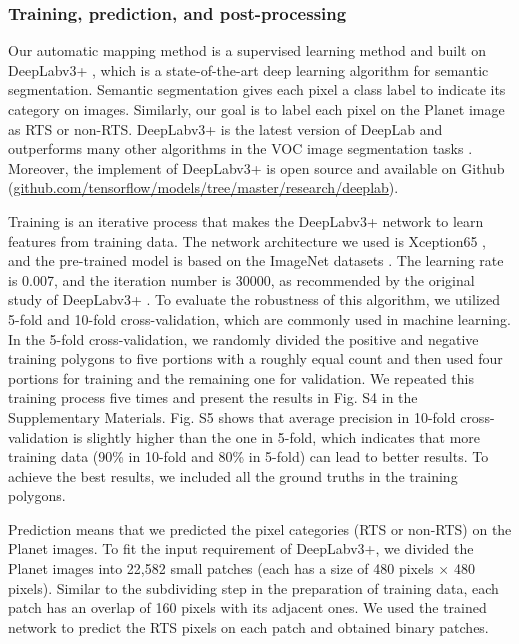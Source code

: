 \documentclass[preprint,12pt,authoryear]{elsarticle}
\begin{document}
\subsubsection{Training, prediction, and post-processing}
\label{subsubsec_deeplab}

Our automatic mapping method is a supervised learning method and built on DeepLabv3+ \citep{chen_encoder-decoder_2018}, which is a state-of-the-art deep learning algorithm for semantic segmentation. Semantic segmentation gives each pixel a class label to indicate its category on images. Similarly, our goal is to label each pixel on the Planet image as RTS or non-RTS. DeepLabv3+ is the latest version of DeepLab and outperforms many other algorithms in the VOC image segmentation tasks \citep{everingham_pascal_2015}. Moreover, the implement of DeepLabv3+ is open source and available on Github (\url{github.com/tensorflow/models/tree/master/research/deeplab}).

Training is an iterative process that makes the DeepLabv3+ network to learn features from training data. The network architecture we used is Xception65 \citep{chollet2017xception}, and the pre-trained model is based on the ImageNet datasets \citep{russakovsky2015imagenet}. The learning rate is 0.007, and the iteration number is 30000, as recommended by the original study of DeepLabv3+ \citep{chen_encoder-decoder_2018}. To evaluate the robustness of this algorithm, we utilized 5-fold and 10-fold cross-validation, which are commonly used in machine learning. In the 5-fold cross-validation, we randomly divided the positive and negative training polygons to five portions with a roughly equal count and then used four portions for training and the remaining one for validation. We repeated this training process five times and present the results in Fig. S4 in the Supplementary Materials. Fig. S5 shows that average precision in 10-fold cross-validation is slightly higher than the one in 5-fold, which indicates that more training data (90\% in 10-fold and 80\% in 5-fold) can lead to better results. To achieve the best results, we included all the ground truths in the training polygons. 

Prediction means that we predicted the pixel categories (RTS or non-RTS) on the Planet images. To fit the input requirement of DeepLabv3+, we divided the Planet images into 22,582 small patches (each has a size of 480 pixels $\times$ 480 pixels). Similar to the subdividing step in the preparation of training data, each patch has an overlap of 160 pixels with its adjacent ones. We used the trained network to predict the RTS pixels on each patch and obtained binary patches. 
\end{document}
